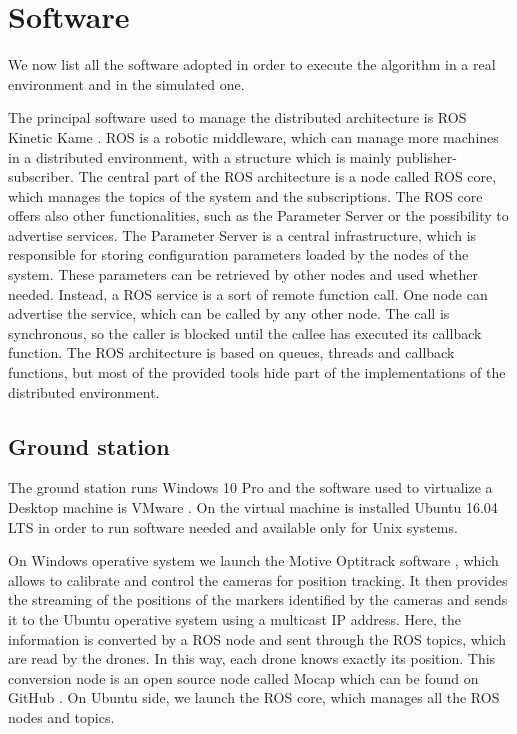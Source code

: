\section{Software}

We now list all the software adopted in order to execute the algorithm
in a real environment and in the simulated one.

The principal software used to manage the distributed architecture is ROS Kinetic
Kame \cite{ros}.
ROS is a robotic middleware, which can manage more machines in a distributed environment,
with a structure which is mainly publisher-subscriber.
The central part of the ROS architecture is a node called ROS core, which manages
the topics of the system and the subscriptions.
The ROS core offers also other functionalities, such as the Parameter Server or the
possibility to advertise services.
The Parameter Server is a central infrastructure, which is responsible for storing
configuration parameters loaded by the nodes of the system.
These parameters can be retrieved by other nodes and used whether needed.
Instead, a ROS service is a sort of remote function call. One node can advertise
the service, which can be called by any other node. The call is synchronous,
so the caller is blocked until the callee has executed its callback function.
The ROS architecture is based on queues, threads and callback functions, but
most of the provided tools hide part of the implementations of the distributed
environment.


\subsection{Ground station}
The ground station runs Windows 10 Pro \cite{windows} and the software used to virtualize a
Desktop machine is VMware \cite{vmware}.
On the virtual machine is installed Ubuntu 16.04 LTS \cite{ubuntu} in order to run software
needed and available only for Unix systems.

On Windows operative system we launch the Motive Optitrack software \cite{optitrack},
which allows to calibrate and control the cameras for position tracking.
It then provides the streaming of the positions of the markers identified
by the cameras and sends it to the Ubuntu operative system using a multicast IP address.
Here, the information is converted by a ROS node and sent through the ROS topics,
which are read by the drones. In this way, each drone knows exactly its position.
This conversion node is an open source node called Mocap which can be found on GitHub \cite{mocap}.
On Ubuntu side, we launch the ROS core, which manages all the ROS nodes and topics.


